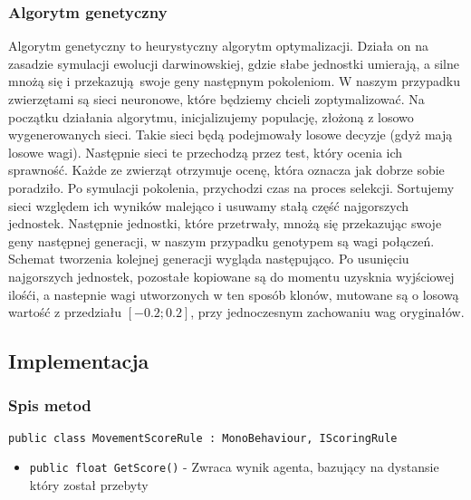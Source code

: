 \documentclass[12pt,a4paper]{article}
\begin{document}
\subsubsection*{Algorytm genetyczny}
Algorytm genetyczny to heurystyczny algorytm optymalizacji. Działa on na zasadzie symulacji ewolucji darwinowskiej, gdzie
słabe jednostki umierają, a silne mnożą się i przekazują swoje geny następnym pokoleniom. W naszym przypadku zwierzętami
są sieci neuronowe, które będziemy chcieli zoptymalizować. Na początku działania algorytmu, inicjalizujemy 
populację, złożoną z losowo wygenerowanych sieci. Takie sieci będą podejmowały losowe decyzje (gdyż mają losowe wagi). Następnie sieci te 
przechodzą przez test, który ocenia ich sprawność. Każde ze zwierząt otrzymuje ocenę, która oznacza jak dobrze sobie poradziło.
Po symulacji pokolenia, przychodzi czas na proces selekcji. Sortujemy sieci względem ich wyników malejąco i usuwamy stałą część najgorszych jednostek.
Następnie jednostki, które przetrwały, mnożą się przekazując swoje geny następnej generacji, w naszym przypadku genotypem są wagi połączeń. Schemat tworzenia kolejnej generacji wygląda następująco. Po usunięciu najgorszych jednostek, pozostałe kopiowane są do momentu uzysknia wyjściowej ilośći, a nastepnie wagi utworzonych w ten sposób klonów, mutowane są o losową wartość z przedziału $[-0.2;0.2]$, przy jednoczesnym zachowaniu wag oryginałów.






\subsection*{Implementacja}
\subsubsection*{Spis metod}
\lstinline{public class MovementScoreRule : MonoBehaviour, IScoringRule}
\begin{itemize}
    \item \lstinline|public float GetScore()| - Zwraca wynik agenta, bazujący na dystansie który został przebyty
\end{itemize}
\end{document}
